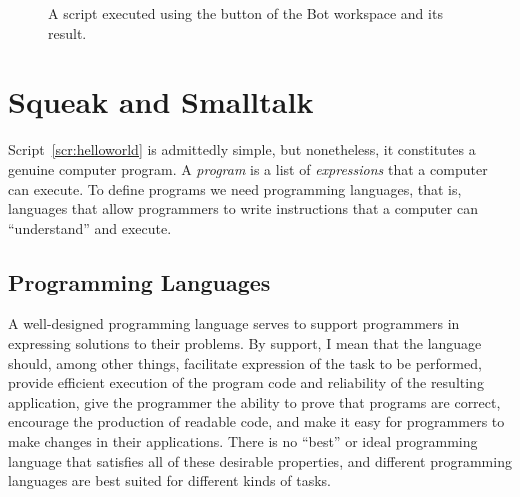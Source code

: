 \documentclass[a4paper,10pt,twoside]{book}
\begin{document}
\begin{figure}[!h]
\caption{A script executed using the  button of the Bot workspace and its result. 
\label{fig:doit}}
\end{figure}


\section{Squeak and Smalltalk}
Script~\ref{scr:helloworld} is admittedly simple, but nonetheless, it constitutes a genuine computer program. A \emph{program} is a list of \emph{expressions} that a computer can execute. To define programs we need programming languages, that is, languages that allow programmers to write instructions that a computer can “understand” and execute. 

\subsection{Programming Languages}
A well-designed programming language serves to support programmers in expressing solutions to their problems. By support, I mean that the language should, among other things, 
facilitate expression of the task to be performed, provide efficient execution of the program 
code and reliability of the resulting application, give the programmer the ability to prove that programs are correct, encourage the production of readable code, and make it easy for programmers to make changes in their applications. There is no “best” or ideal programming 
language that satisfies all of these desirable properties, and different programming languages 
are best suited for different kinds of tasks. 
\end{document}
